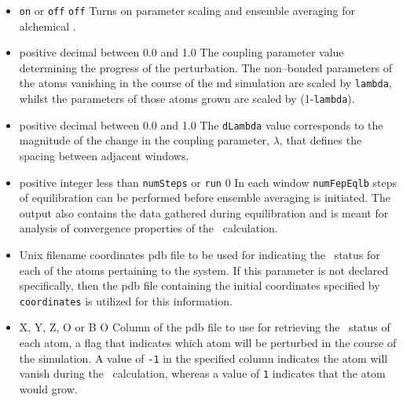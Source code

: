 \begin{itemize}

\item
{}
{{\tt on} or {\tt off}}
{{\tt off}}
{Turns on parameter scaling and ensemble averaging for alchemical \FEP.}

\item
{}
{positive decimal between 0.0 and 1.0}
{The coupling parameter value determining the progress of the
perturbation. The non--bonded parameters of the atoms vanishing
in the course of the {\sc md} simulation are scaled by {\tt lambda}, whilst
the parameters of those atoms grown are scaled by (1-{\tt lambda}).}

\item
{}
{positive decimal between 0.0 and 1.0}
{The {\tt dLambda} value corresponds to the magnitude of the change in
the coupling parameter, $\lambda$, that defines the spacing between
adjacent windows.}

\item
{}
{positive integer less than {\tt numSteps} or {\tt run}}
{0}
{In each window {\tt numFepEqlb} steps of equilibration can be
performed before ensemble averaging is initiated. The output also contains
the data gathered during equilibration and is meant for analysis of
convergence properties of the \FEP\ calculation.}

\item
{}
{{\sc Unix} filename}
{coordinates}
{{\sc pdb} file to be used for indicating the \FEP\ status for each of
the atoms pertaining to the system. 
If this parameter is not declared specifically, then the
{\sc pdb} file containing the initial coordinates specified by
{\tt coordinates} is utilized for this information.}

\item
{}
{X, Y, Z, O or B}
{O}
{Column of the {\sc pdb} file to use for retrieving the \FEP\ status 
of each atom, \ie a flag that indicates which atom will be perturbed
in the course of the simulation.
A value of {\tt -1} in the specified column indicates the atom will
vanish during the \FEP\ calculation, whereas a value of {\tt 1} 
indicates that the atom would grow.}


\end{itemize}
